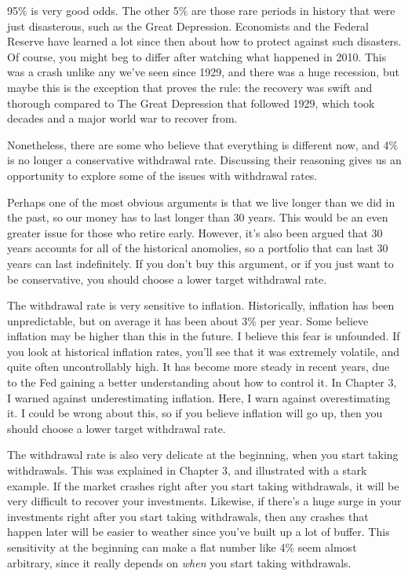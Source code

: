 95\% is very good odds. The other 5\% are those rare periods in history that were just disasterous, such as the Great Depression. Economists and the Federal Reserve have learned a lot since then about how to protect against such disasters. Of course, you might beg to differ after watching what happened in 2010. This was a crash unlike any we've seen since 1929, and there was a huge recession, but maybe this is the exception that proves the rule: the recovery was swift and thorough compared to The Great Depression that followed 1929, which took decades and a major world war to recover from.

Nonetheless, there are some who believe that everything is different now, and 4\% is no longer a conservative withdrawal rate. Discussing their reasoning gives us an opportunity to explore some of the issues with withdrawal rates.

Perhaps one of the most obvious arguments is that we live longer than we did in the past, so our money has to last longer than 30 years. This would be an even greater issue for those who retire early. However, it's also been argued that 30 years accounts for all of the historical anomolies, so a portfolio that can last 30 years can last indefinitely. If you don't buy this argument, or if you just want to be conservative, you should choose a lower target withdrawal rate.

The withdrawal rate is very sensitive to inflation. Historically, inflation has been unpredictable, but on average it has been about 3\% per year.\cite{inflationdata.com} Some believe inflation may be higher than this in the future. I believe this fear is unfounded. If you look at historical inflation rates, you'll see that it was extremely volatile, and quite often uncontrollably high. It has become more steady in recent years, due to the Fed gaining a better understanding about how to control it.\cite{multpl-inflation} In Chapter 3, I warned against underestimating inflation. Here, I warn against overestimating it. I could be wrong about this, so if you believe inflation will go up, then you should choose a lower target withdrawal rate.

The withdrawal rate is also very delicate at the beginning, when you start taking withdrawals. This was explained in Chapter 3, and illustrated with a stark example. If the market crashes right after you start taking withdrawals, it will be very difficult to recover your investments. Likewise, if there's a huge surge in your investments right after you start taking withdrawals, then any crashes that happen later will be easier to weather since you've built up a lot of buffer. This sensitivity at the beginning can make a flat number like 4\% seem almost arbitrary, since it really depends on \emph{when} you start taking withdrawals.

